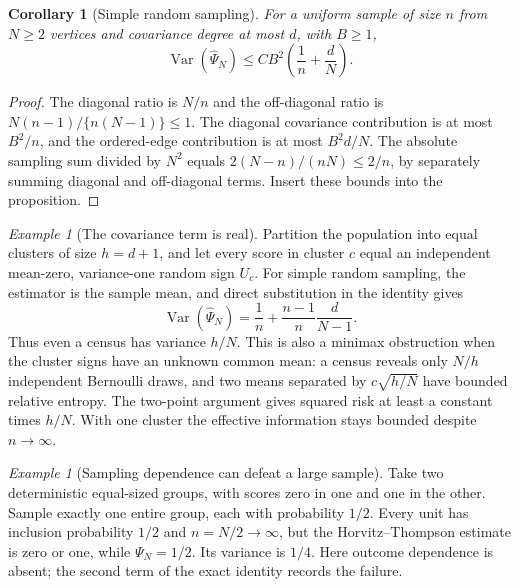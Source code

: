 \documentclass[11pt]{article}
\newtheorem{corollary}[theorem]{Corollary}
\theoremstyle{remark}
\newtheorem{example}[theorem]{Example}
\begin{document}
\begin{corollary}[Simple random sampling]
For a uniform sample of size $n$ from $N\ge2$ vertices and covariance degree at most $d$, with $B\ge1$,
\[
 \operatorname{Var}(\widehat\Psi_N)\le C B^2\left(\frac1n+\frac dN\right).
\]
\end{corollary}
\begin{proof}
The diagonal ratio is $N/n$ and the off-diagonal ratio is
$N(n-1)/\{n(N-1)\}\le1$. The diagonal covariance contribution is at most $B^2/n$, and the ordered-edge contribution is at most $B^2d/N$. The absolute sampling sum divided by $N^2$ equals $2(N-n)/(nN)\le2/n$, by separately summing diagonal and off-diagonal terms. Insert these bounds into the proposition.
\end{proof}

\begin{example}[The covariance term is real]
Partition the population into equal clusters of size $h=d+1$, and let every score in cluster $c$ equal an independent mean-zero, variance-one random sign $U_c$. For simple random sampling, the estimator is the sample mean, and direct substitution in the identity gives
\[
 \operatorname{Var}(\widehat\Psi_N)=\frac1n+
 \frac{n-1}{n}\frac d{N-1}.
\]
Thus even a census has variance $h/N$. This is also a minimax obstruction when the cluster signs have an unknown common mean: a census reveals only $N/h$ independent Bernoulli draws, and two means separated by $c\sqrt{h/N}$ have bounded relative entropy. The two-point argument gives squared risk at least a constant times $h/N$. With one cluster the effective information stays bounded despite $n\to\infty$.
\end{example}

\begin{example}[Sampling dependence can defeat a large sample]
Take two deterministic equal-sized groups, with scores zero in one and one in the other. Sample exactly one entire group, each with probability $1/2$. Every unit has inclusion probability $1/2$ and $n=N/2\to\infty$, but the Horvitz--Thompson estimate is zero or one, while $\Psi_N=1/2$. Its variance is $1/4$. Here outcome dependence is absent; the second term of the exact identity records the failure.
\end{example}
\end{document}
